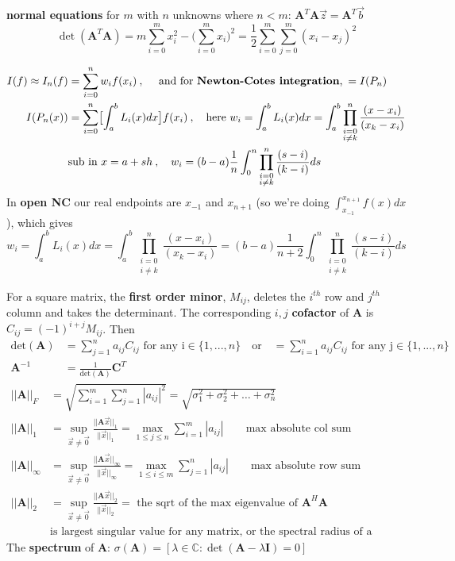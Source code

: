 \documentclass[12pt]{article}
\newcommand{\ve}[1]{\ensuremath{\mathbf{#1}}}
\begin{document}
\textbf{normal equations} for $m$ with $n$ unknowns where $n<m$: $\ve{A}^T\ve{A} \vec{z} = \ve{A}^T\vec{b}$
%
\[\det(\ve{A}^T\ve{A}) = m \sum_{i=0}^m x_i^2 -  \bigl(\sum_{i=0}^m x_i\bigr)^2 = \frac{1}{2} \sum_{i=0}^m \sum_{j=0}^m (x_i - x_j)^2\]

\begin{align*}
I(f) \approx I_n(f) &= \sum_{i=0}^n w_i f(x_i)\:, \quad \text{ and for \textbf{Newton-Cotes integration},} \: = I(P_n)\\
%
I(P_n(x)) &= \sum_{i=0}^{n} \bigl[ \int_a^b L_i(x)dx \bigr] f(x_i)\:, \quad \text{here } w_i =  \int_a^b L_i(x)dx = \int_a^b \prod_{\substack{i=0\\ i \neq k}}^n \frac{(x-x_i)}{(x_k-x_i)} \\
%
&\text{sub in } x = a + sh\:, \quad w_{i}=  (b-a)\frac{1}{n}\int_0^n \prod_{\substack{i=0\\ i \neq k}}^n \frac{(s-i)}{(k-i)}ds
\end{align*}
%
In \textbf{open NC} our real endpoints are $x_{-1}$ and $x_{n+1}$ (so we're doing $\int_{x_{-1}}^{x_{n+1}} f(x)dx$), which gives
\[
 w_i =  \int_a^b L_i(x)dx = \int_a^b \prod_{\substack{i=0\\ i \neq k}}^n \frac{(x-x_i)}{(x_k-x_i)} =  (b-a)\frac{1}{n+2}\int_0^n \prod_{\substack{i=0\\ i \neq k}}^n \frac{(s-i)}{(k-i)}ds
 \]
 
 For a square matrix, the \textbf{first order minor}, $M_{ij}$, deletes the $i^{th}$ row and $j^{th}$ column and takes the determinant. The corresponding $i,j$ \textbf{cofactor} of $\ve{A}$ is $C_{ij} = (-1)^{i+j} M_{ij}$. Then
%
\begin{align*}
\text{det}(\ve{A}) &= \sum_{j=1}^n a_{ij} C_{ij} \text{ for any i} \in \{1,...,n\} \quad\text{or}\quad = \sum_{i=1}^n a_{ij} C_{ij} \text{ for any j} \in \{1,...,n\} \\
\ve{A}^{-1} &= \frac{1}{\text{det}(\ve{A})}\ve{C}^T
\end{align*}
%
\begin{align*}
||\ve{A}||_F &= \sqrt{ \sum_{i=1}^m \sum_{j=1}^n |a_{ij}|^2 } = \sqrt{\sigma_1^2 + \sigma_2^2 + \dots + \sigma_n^2}\\
%
||\ve{A}||_{1} &= \displaystyle \sup_{\vec{x} \neq \vec{0}} \frac{||\ve{A}\vec{x}||_{1}}{||\vec{x}||_{1}} =
\displaystyle \max_{1 \leq j \leq n} \sum_{i=1}^m |a_{ij}| \qquad \text{max absolute col sum} \nonumber \\
%
||\ve{A}||_{\infty} &= \displaystyle \sup_{\vec{x} \neq \vec{0}} \frac{||\ve{A}\vec{x}||_{\infty}}{||\vec{x}||_{\infty}} = 
\displaystyle \max_{1 \leq i \leq m} \sum_{j=1}^n |a_{ij}| \qquad \text{max absolute row sum}\nonumber \\
%
||\ve{A}||_{2} &= \displaystyle \sup_{\vec{x} \neq \vec{0}} \frac{||\ve{A}\vec{x}||_{2}}{||\vec{x}||_{2}} = \text{ the sqrt of the max  eigenvalue of }\ve{A}^H\ve{A} \nonumber \\
&\text{is largest singular value for any matrix, or the spectral radius of a square matrix} \nonumber 
\end{align*}
%
The \textbf{spectrum} of $\ve{A}$: $\sigma(\ve{A}) = [ \lambda \in \mathbb{C} : \det(\ve{A} - \lambda \ve{I})=0] $
\end{document}

